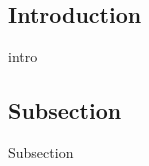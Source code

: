 \begin{multicols}{2}
	\tableofcontents
	\section{Introduction}
	intro
	\subsection{Subsection}
	Subsection
\end{multicols}